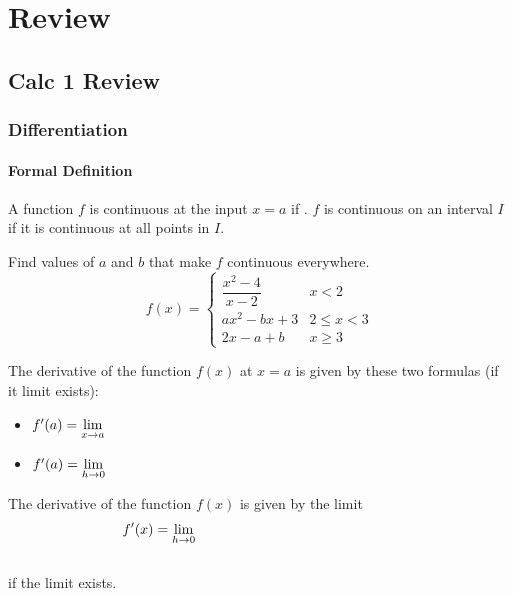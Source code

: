 \documentclass[notes]{subfiles}
\begin{document}
	\chapter*{Review}
	\setcounter{section}{0}
	\setcounter{page}{1}
	\fancyhead[LO,RE]{\bfseries \small \currentname}
	\fancyfoot[C]{{}}
	\fancyfoot[RO,LE]{\large \thepage}	%
	
\section*{Calc 1 Review}\label{csr}
	\subsection*{Differentiation}
	\subsubsection*{Formal Definition}
		\begin{defn}[Continuity]
			A function $f$ is continuous at the input $x =a$ if .  $f$ is continuous on an interval $I$ if it is continuous at all points in $I$.
		\end{defn}
		\begin{ex}
			Find values of $a$ and $b$ that make $f$ continuous everywhere.
				\[f(x) = \begin{cases}\dfrac{x^2-4}{x-2} & x < 2 \\ ax^2 - bx +  3& 2\leq x < 3 \\ 2x - a + b & x \geq 3 \end{cases}\]
		\end{ex}
			
		\begin{defn}[Derivative of $f$ at $x =a$]
			The derivative of the function $f(x)$ at $x =a$ is given by these two formulas (if it limit exists):\\[15pt]
			\begin{itemize}
				\setlength \itemsep{25pt}
				
				\item $f'(a) = \displaystyle \lim_{x\to a}$
				\item $f'(a) = \displaystyle \lim_{h\to 0}$
			\end{itemize}
		\end{defn}
			\newpage
			
		\begin{defn}
			The derivative of the function $f(x)$ is given by the limit\\[15pt]
				\[f'(x) = \displaystyle \lim_{h\to 0} \hspace{2in}\]
				\\
			if the limit exists.
		\end{defn}
		
\end{document}
